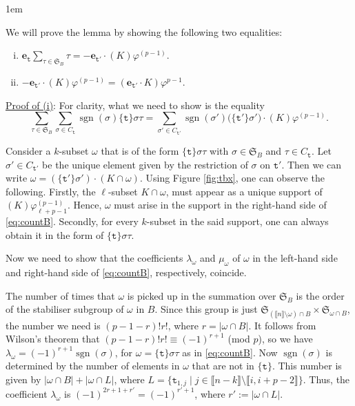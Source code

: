 \documentclass[a4paper]{amsart}
\makeatletter
\numberwithin{equation}{subsection}
\theoremstyle{definition}
\newcommand{\interval}[1]{\llbracket #1 \rrbracket}
\DeclareMathOperator{\sgn}{\mathrm{sgn}}
\newcommand{\bfe}{\pmb{e}}
\newcommand{\tbx}{\mathtt{t}}
\renewenvironment{proof}[1][\proofname]{\par
	\pushQED{\qed}%
	\normalfont \topsep0\p@\@plus6\p@ \labelsep1em\relax
	\trivlist
	\item[\hskip\labelsep\bfseries #1]\ignorespaces
	\mbox{}%
}{
	\popQED\endtrivlist\@endpefalse
}
\numberwithin{equation}{subsection}
\makeatother
\begin{document}
\begin{proof}
We will prove the lemma by showing the following two equalities:
\begin{enumerate}[(i)]
\item $\bfe_\tbx \sum_{\tau\in \mathfrak{S}_B} \tau = -\bfe_{\tbx'}\cdot(K)\varphi^{(p-1)}$.
\item $-\bfe_{\tbx'}\cdot(K)\varphi^{(p-1)} = (\bfe_{\tbx'}\cdot K)\varphi^{p-1}$.
\end{enumerate}

\underline{Proof of (i)}: 
For clarity, what we need to show is the equality
\begin{equation}\label{eq:countB}
\sum_{\tau\in \mathfrak{S}_B} \sum_{\sigma\in C_{\tbx}} \sgn(\sigma)\{\tbx\}\sigma\tau = \sum_{\sigma' \in C_{\tbx'}} \sgn(\sigma')\big(\{\tbx'\}\sigma'\big) \cdot (K)\varphi^{(p-1)}.
\end{equation}

Consider a $k$-subset $\omega$ that is of the form $\{\tbx\}\sigma\tau$ with $\sigma\in \mathfrak{S}_B$ and $\tau\in C_\tbx$.
Let $\sigma'\in C_{\tbx'}$ be the unique element given by the restriction of $\sigma$ on $\tbx'$.
Then we can write $\omega = (\{\tbx'\}\sigma')\cdot (K\cap \omega)$.
Using Figure \ref{fig:tbx}, one can observe the following.
Firstly, the $\ell$-subset $K\cap\omega$, must  appear as a unique support of $(K)\varphi_{\ell+p-1}^{(p-1)}$.
Hence, $\omega$ must arise in the support in the right-hand side of \eqref{eq:countB}.
Secondly, for every $k$-subset in the said support, one can always obtain it in the form of $\{\tbx\}\sigma\tau$.

Now we need to show that the coefficients $\lambda_\omega$ and $\mu_\omega$ of $\omega$ in the left-hand side and right-hand side of \eqref{eq:countB}, respectively, coincide.

The number of times that $\omega$ is picked up in the summation over $\mathfrak{S}_B$ is the order of the stabiliser subgroup of $\omega$ in $B$.
Since this group is just $\mathfrak{S}_{(\interval{n}\setminus\omega)\cap B} \times \mathfrak{S}_{\omega\cap B}$, the number we need is $(p-1-r)!r!$, where $r=|\omega\cap B|$.
It follows from Wilson's theorem that $(p-1-r)!r!\equiv (-1)^{r+1}$ (mod $p$), so we have $\lambda_\omega = (-1)^{r+1}\sgn(\sigma)$, for $\omega = \{\tbx\}\sigma\tau$ as in \eqref{eq:countB}.
Now $\sgn(\sigma)$ is determined by the number of elements in $\omega$ that are not in $\{\tbx\}$.
This number is given by $|\omega\cap B| + |\omega \cap L|$, where $L=\{\tbx_{1,j}\mid j\in\interval{n-k}\setminus\interval{i,i+p-2} \}$.
Thus, the coefficient $\lambda_\omega$ is $(-1)^{2r+1+r'} = (-1)^{r'+1}$, where $r':=|\omega \cap L|$.


\end{proof}
\end{document}
